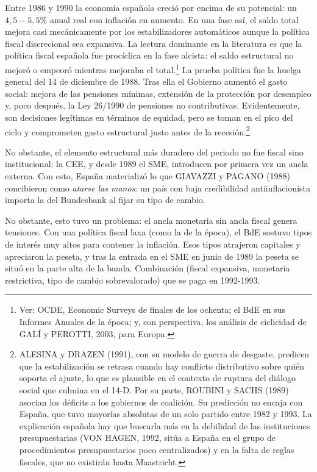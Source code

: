 \documentclass[10pt,a4paper]{article}
\begin{document}
Entre 1986 y 1990 la economía española creció por encima de su potencial: un $4,5-5,5\%$ anual real con inflación en aumento. En una fase así, el saldo total mejora casi mecánicamente por los estabilizadores automáticos aunque la política fiscal discrecional sea expansiva. La lectura dominante en la literatura es que la política fiscal española fue procíclica en la fase alcista: el saldo estructural no mejoró o empeoró mientras mejoraba el total.\footnote{Ver: OCDE, Economic Surveys de finales de los ochenta; el BdE en sus Informes Anuales de la época; y, con perspectiva, los análisis de ciclicidad de GALÍ y PEROTTI, 2003, para Europa.
} La prueba política fue la huelga general del 14 de diciembre de 1988. Tras ella el Gobierno aumentó el gasto social: mejora de las pensiones mínimas, extensión de la protección por desempleo y, poco después, la Ley 26/1990 de pensiones no contributivas. Evidentemente, son decisiones legítimas en términos de equidad, pero se toman en el pico del ciclo y comprometen gasto estructural justo antes de la recesión.\footnote{ALESINA y DRAZEN (1991), con su modelo de guerra de desgaste, predicen que la estabilización se retrasa cuando hay conflicto distributivo sobre quién soporta el ajuste, lo que es plausible en el contexto de ruptura del diálogo social que culmina en el 14-D. Por su parte, ROUBINI y SACHS (1989) asocian los déficits a los gobiernos de coalición. Su predicción no encaja con España, que tuvo mayorías absolutas de un solo partido entre 1982 y 1993. La explicación española hay que buscarla más en la debilidad de las instituciones presupuestarias (VON HAGEN, 1992, sitúa a España en el grupo de procedimientos presupuestarios poco centralizados) y en la falta de reglas fiscales, que no existirán hasta Maastricht.
}

No obstante, el elemento estructural más duradero del periodo no fue fiscal sino institucional: la CEE, y desde 1989 el SME, introducen por primera vez un ancla externa. Con esto, España materializó lo que GIAVAZZI y PAGANO (1988) concibieron como \textit{atarse las manos}: un país con baja credibilidad antiinflacionista importa la del Bundesbank al fijar su tipo de cambio. 

No obstante, esto tuvo un problema: el ancla monetaria sin ancla fiscal genera tensiones. Con una política fiscal laxa (como la de la época), el BdE sostuvo tipos de interés muy altos para contener la inflación. Esos tipos atrajeron capitales y apreciaron la peseta, y tras la entrada en el SME en junio de 1989 la peseta se situó en la parte alta de la banda. Combinación (fiscal expansiva, monetaria restrictiva, tipo de cambio sobrevalorado) que se paga en 1992-1993.
\end{document}
